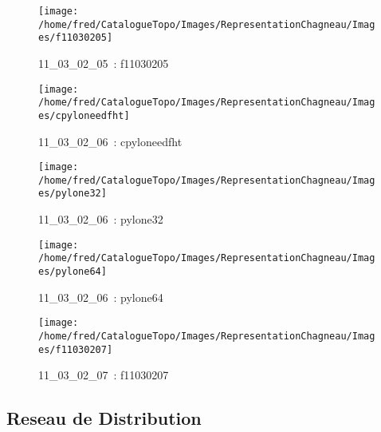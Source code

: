 \documentclass[12pt,titlepage]{book}
\begin{document}
\begin{figure}[h!]
  \hfill         %
  \begin{minipage}[t]{3cm}
    \begin{center}
      \texttt{[image: /home/fred/CatalogueTopo/Images/RepresentationChagneau/Images/f11030205]}
      \caption[~11\_03\_02\_05]{\small{11\_03\_02\_05~:} \tiny{f11030205}}\label{f11030205}
    \end{center}
  \end{minipage}
  \begin{minipage}[t]{3cm}
    \begin{center}
      \texttt{[image: /home/fred/CatalogueTopo/Images/RepresentationChagneau/Images/cpyloneedfht]}
      \caption[~11\_03\_02\_06]{\small{11\_03\_02\_06~:} \tiny{cpyloneedfht}}\label{cpyloneedfht}
    \end{center}
  \end{minipage}
  \begin{minipage}[t]{3cm}
    \begin{center}
      \texttt{[image: /home/fred/CatalogueTopo/Images/RepresentationChagneau/Images/pylone32]}
      \caption[~11\_03\_02\_06]{\small{11\_03\_02\_06~:} \tiny{pylone32}}\label{pylone32}
    \end{center}
  \end{minipage}
  \begin{minipage}[t]{3cm}
    \begin{center}
      \texttt{[image: /home/fred/CatalogueTopo/Images/RepresentationChagneau/Images/pylone64]}
      \caption[~11\_03\_02\_06]{\small{11\_03\_02\_06~:} \tiny{pylone64}}\label{pylone64}
    \end{center}
  \end{minipage}
  \begin{minipage}[t]{3cm}
    \begin{center}
      \texttt{[image: /home/fred/CatalogueTopo/Images/RepresentationChagneau/Images/f11030207]}
      \caption[~11\_03\_02\_07]{\small{11\_03\_02\_07~:} \tiny{f11030207}}\label{f11030207}
    \end{center}
  \end{minipage}
\end{figure}
\subsection{Reseau de Distribution}
\end{document}
